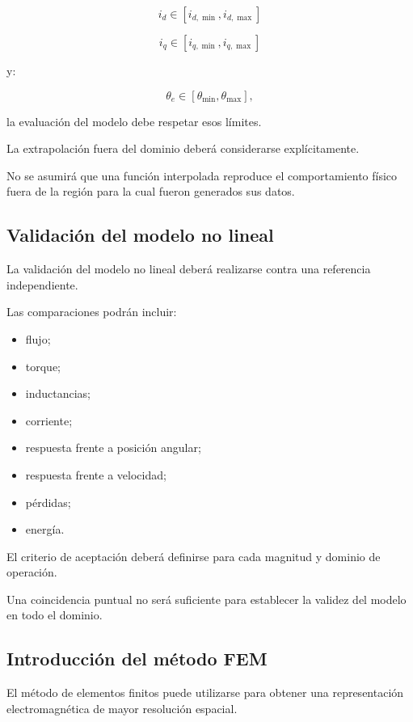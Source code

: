 \begin{equation}
i_d\in[i_{d,\min},i_{d,\max}]
\end{equation}

\begin{equation}
i_q\in[i_{q,\min},i_{q,\max}]
\end{equation}

y:

\begin{equation}
\theta_e\in[\theta_{\min},\theta_{\max}],
\end{equation}

la evaluación del modelo debe respetar esos límites.

La extrapolación fuera del dominio deberá considerarse explícitamente.

No se asumirá que una función interpolada reproduce el comportamiento físico fuera de la región para la cual fueron generados sus datos.

\subsection{Validación del modelo no lineal}

La validación del modelo no lineal deberá realizarse contra una referencia independiente.

Las comparaciones podrán incluir:

\begin{itemize}
\item flujo;
\item torque;
\item inductancias;
\item corriente;
\item respuesta frente a posición angular;
\item respuesta frente a velocidad;
\item pérdidas;
\item energía.
\end{itemize}

El criterio de aceptación deberá definirse para cada magnitud y dominio de operación.

Una coincidencia puntual no será suficiente para establecer la validez del modelo en todo el dominio.

\subsection{Introducción del método FEM}

El método de elementos finitos puede utilizarse para obtener una representación electromagnética de mayor resolución espacial.

